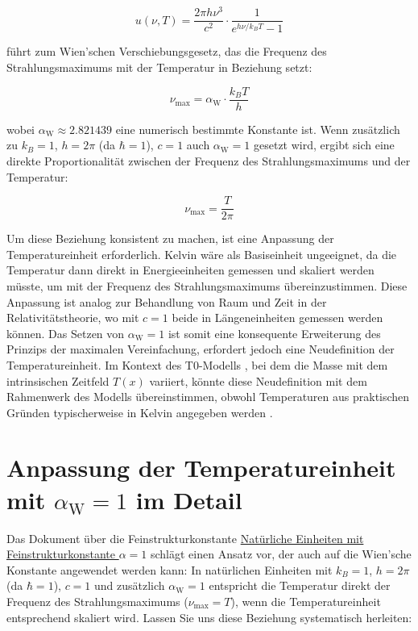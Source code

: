 \documentclass[12pt,a4paper]{article}
\newcommand{\Tfield}{T(x)}
\newcommand{\alphaW}{\alpha_{\text{W}}}
\begin{document}
	\begin{equation}
		u(\nu, T) = \frac{2\pi h \nu^3}{c^2} \cdot \frac{1}{e^{h \nu / k_B T} - 1}
	\end{equation}
	
	führt zum Wien'schen Verschiebungsgesetz, das die Frequenz des Strahlungsmaximums mit der Temperatur in Beziehung setzt:
	
	\begin{equation}
		\nu_{\text{max}} = \alphaW \cdot \frac{k_B T}{h}
	\end{equation}
	
	wobei \(\alphaW \approx 2.821439\) eine numerisch bestimmte Konstante ist. Wenn zusätzlich zu \(k_B = 1\), \(h = 2\pi\) (da \(\hbar = 1\)), \(c = 1\) auch \(\alphaW = 1\) gesetzt wird, ergibt sich eine direkte Proportionalität zwischen der Frequenz des Strahlungsmaximums und der Temperatur:
	
	\begin{equation}
		\nu_{\text{max}} = \frac{T}{2\pi}
	\end{equation}
	
	Um diese Beziehung konsistent zu machen, ist eine Anpassung der Temperatureinheit erforderlich. Kelvin wäre als Basiseinheit ungeeignet, da die Temperatur dann direkt in Energieeinheiten gemessen und skaliert werden müsste, um mit der Frequenz des Strahlungsmaximums übereinzustimmen. Diese Anpassung ist analog zur Behandlung von Raum und Zeit in der Relativitätstheorie, wo mit \(c = 1\) beide in Längeneinheiten gemessen werden können. Das Setzen von \(\alphaW = 1\) ist somit eine konsequente Erweiterung des Prinzips der maximalen Vereinfachung, erfordert jedoch eine Neudefinition der Temperatureinheit. Im Kontext des T0-Modells \cite{pascher_galaxies_2025}, bei dem die Masse mit dem intrinsischen Zeitfeld \(\Tfield\) variiert, könnte diese Neudefinition mit dem Rahmenwerk des Modells übereinstimmen, obwohl Temperaturen aus praktischen Gründen typischerweise in Kelvin angegeben werden \cite{pascher_messdifferenzen_2025}.
	
	\section{Anpassung der Temperatureinheit mit \(\alphaW = 1\) im Detail}
	\label{sec:detailed_adjustment}
	
	Das Dokument über die Feinstrukturkonstante \href{https://github.com/jpascher/T0-Time-Mass-Duality/tree/main/2/pdf/Deutsch/NatEinheitenAlpha1.pdf}{Natürliche Einheiten mit Feinstrukturkonstante \(\alpha = 1\)} \cite{pascher_alpha_2025} schlägt einen Ansatz vor, der auch auf die Wien'sche Konstante angewendet werden kann: In natürlichen Einheiten mit \(k_B = 1\), \(h = 2\pi\) (da \(\hbar = 1\)), \(c = 1\) und zusätzlich \(\alphaW = 1\) entspricht die Temperatur direkt der Frequenz des Strahlungsmaximums (\(\nu_{\text{max}} = T\)), wenn die Temperatureinheit entsprechend skaliert wird. Lassen Sie uns diese Beziehung systematisch herleiten:
	
\end{document}
